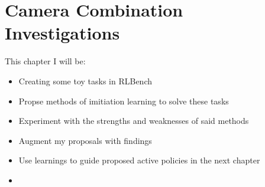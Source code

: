 \chapter{Camera Combination Investigations}
This chapter I will be:
\begin{itemize}
  \item Creating some toy tasks in RLBench
  \item Propse methods of imitiation learning to solve these tasks
  \item Experiment with the strengths and weaknesses of said methods
  \item Augment my proposals with findings
  \item Use learnings to guide proposed active policies in the next chapter 
  
  \item 
\end{itemize}






